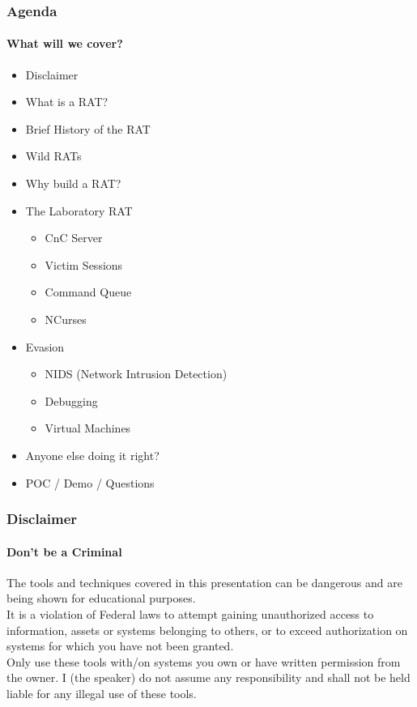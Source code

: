 \documentclass[aspectratio=169]{beamer}
\begin{document}
\begin{frame}
  \frametitle{Agenda}
  \framesubtitle{What will we cover?}
  \begin{itemize}
  \item{Disclaimer}
  \item{What is a RAT?}
  \item{Brief History of the RAT}
  \item{Wild RATs}
  \item{Why build a RAT?}
  \item{The Laboratory RAT}
    \begin{itemize}
    \item{CnC Server}
    \item{Victim Sessions}
    \item{Command Queue}
    \item{NCurses}
    \end{itemize}
  \item{Evasion}
    \begin{itemize}
    \item{NIDS (Network Intrusion Detection)}
    \item{Debugging}
    \item{Virtual Machines}
    \end{itemize}
  \item{Anyone else doing it right?}
  \item{POC / Demo / Questions}
  \end{itemize}
\end{frame}

\begin{frame}
  \frametitle{Disclaimer}
  \framesubtitle{Don't be a Criminal}
  \begin{tcolorbox}[title=disclaimer.log,colback=gray]
    The tools and techniques covered in this presentation can be dangerous and are\\
    being shown for educational purposes.\\
    \newline
    It is a violation of Federal laws to attempt gaining unauthorized access to information, assets or systems belonging to others, or to exceed authorization on systems for which you have not been granted.\\
    \newline
    Only use these tools with/on systems you own or have written permission from the owner. I (the speaker) do not assume any responsibility and shall not be held liable for any illegal use of these tools.\\
  \end{tcolorbox}
\end{frame}
\end{document}
